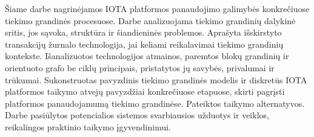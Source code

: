 
Šiame darbe nagrinėjamos IOTA platformos panaudojimo galimybės konkrečiuose tiekimo grandinės procesuose. 
Darbe analizuojama tiekimo grandinių dalykinė sritis, jos sąvoka, struktūra ir šiandieninės problemos.
Aprašyta išskirstyto transakcijų žurnalo technologija, jai keliami reikalavimai tiekimo grandinių kontekste. Išanalizuotos technologijos atmainos, paremtos blokų grandinių ir orientuoto grafo be ciklų principais, pristatytos jų savybės, privalumai ir trūkumai. 
Sukonstruotas pavyzdinis tiekimo grandinės modelis ir diskretūs IOTA platformos taikymo atvejų pavyzdžiai konkrečiuose etapuose, skirti pagrįsti platformos panaudojamumą tiekimo grandinėse. Pateiktos taikymo alternatyvos. 
Darbe pasiūlytos potencialios sistemos svarbiausios užduotys ir veiklos, reikalingos praktinio taikymo įgyvendinimui.




